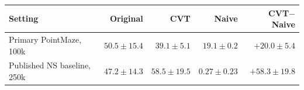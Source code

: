 \begin{tabular}{lrrrr}
\toprule
Setting & Original & CVT & Naive & CVT$-$Naive \\
\midrule
Primary PointMaze, 100k & $50.5\pm15.4$ & $39.1\pm5.1$ & $19.1\pm0.2$ & $+20.0\pm5.4$ \\
Published NS baseline, 250k & $47.2\pm14.3$ & $58.5\pm19.5$ & $0.27\pm0.23$ & $+58.3\pm19.8$ \\
\bottomrule
\end{tabular}

